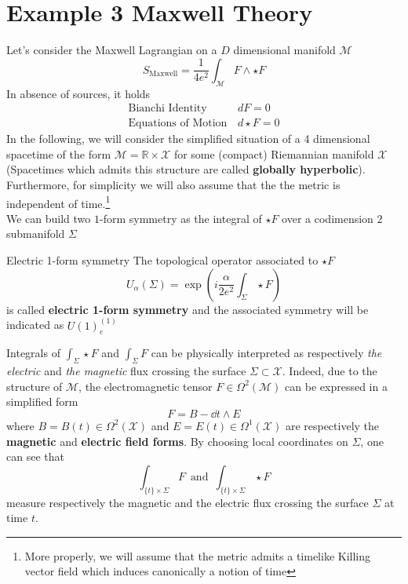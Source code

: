 \section{Example 3 Maxwell Theory}
Let's consider the Maxwell Lagrangian on a $D$ dimensional manifold $\mathcal{M}$
\begin{equation}
    S_{\text{Maxwell}} = \frac{1}{4 e^2} \int_{\mathcal{M}} F \wedge \star F 
\end{equation}
In absence of sources, it holds
\begin{equation}
    \begin{aligned}
       \text{Bianchi Identity}&\, dF=0\\
        \text{Equations of Motion}&\, d \star F=0
    \end{aligned}
\end{equation}
In the following, we will consider the simplified situation of a 4 dimensional spacetime of the form $\mathcal{M}=\mathbb{R}\times \mathcal{X}$ for some (compact) Riemannian manifold $\mathcal{X}$ (Spacetimes which admits this structure are called \textbf{globally hyperbolic}). Furthermore, for simplicity we will also assume that the the metric is independent of time.\footnote{More properly, we will assume that the metric admits a timelike Killing vector field which induces canonically a notion of time}\\


We can build two $1$-form symmetry as the integral of $\star F$ over a codimension $2$ submanifold $\Sigma$
\begin{defn}{Electric 1-form symmetry}{}
The topological operator associated to $\star F$
    \begin{equation}
    U_{\alpha}(\Sigma) = \exp(i \frac{\alpha}{2e^2} \int_{\Sigma} \star F)
    \label{eq:TopEleMaxwell}
\end{equation}
is called \textbf{electric 1-form symmetry} and the associated symmetry will be indicated as $U(1)^{(1)}_e$
\end{defn}

Integrals of $\int_{\Sigma} \star F$ and $\int_{\Sigma} F$ can be physically interpreted as respectively \textit{the electric} and \textit{the magnetic} flux crossing the surface $\Sigma \subset \mathcal{X}$. Indeed, due to the structure of $\mathcal{M}$, the electromagnetic tensor $F \in \Omega^2(\mathcal{M})$ can be expressed in a simplified form
\begin{equation}
    F=B-\dd{t}\wedge E
\end{equation} 
where $B=B(t)\in\Omega^2(\mathcal{X})$ and $E=E(t)\in \Omega^1(\mathcal{X})$ are respectively the \textbf{magnetic} and \textbf{electric field forms}. By choosing local coordinates on $\Sigma$, one can see that
\begin{equation}
    \int_{{\{t\}\times\Sigma}} F \,\,\, \text{and} \,\,\, \int_{{\{t\}\times\Sigma}} \star F
\end{equation}
measure respectively the magnetic and the electric flux crossing the surface $\Sigma$ at time $t$.

